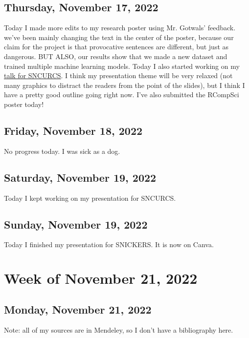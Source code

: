 \documentclass[11pt,letterpaper]{article}
\begin{document}
\subsection{Thursday, November 17, 2022}
Today I made more edits to my research poster using Mr. Gotwals' feedback. we've been mainly changing the text in the center of the poster, because our claim for the project is that provocative sentences are different, but just as dangerous. BUT ALSO, our results show that we made a new dataset and trained multiple machine learning models. Today I also started working on my \href{https://docs.google.com/presentation/d/1spHO8QKtwy8Nd1oF7E_m8MraOz_HqJvcrgR8pfkyHd4/edit?usp=sharing}{talk for SNCURCS}. I think my presentation theme will be very relaxed (not many graphics to distract the readers from the point of the slides), but I think I have a pretty good outline going right now. I've also submitted the RCompSci poster today!

\subsection{Friday, November 18, 2022}
No progress today. I was sick as a dog.

\subsection{Saturday, November 19, 2022}
Today I kept working on my presentation for SNCURCS.

\subsection{Sunday, November 19, 2022}
Today I finished my presentation for SNICKERS. It is now on Canva.

\section{Week of November 21, 2022}
\subsection{Monday, November 21, 2022}



\newpage
Note: all of my sources are in Mendeley, so I don't have a bibliography here.
\end{document}
